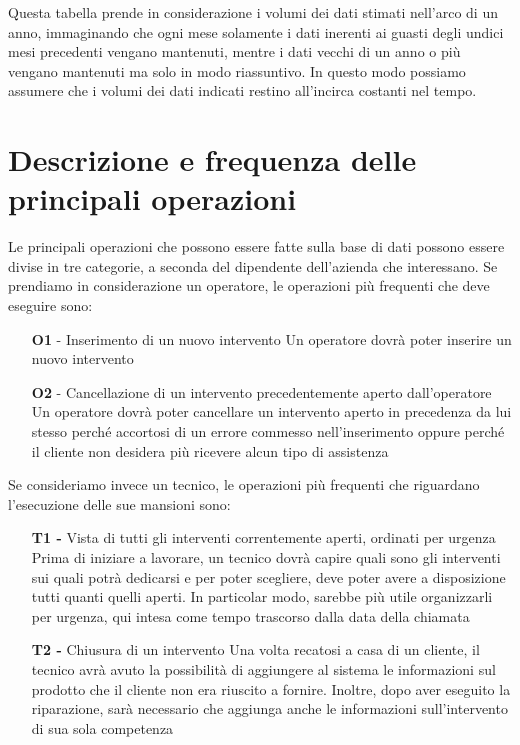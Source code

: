 \documentclass[a4paper, 12pt]{report}
\begin{document}
Questa tabella prende in considerazione i volumi dei dati stimati nell'arco di un anno, immaginando che ogni mese solamente i dati inerenti ai guasti
degli undici mesi precedenti vengano mantenuti, mentre i dati vecchi di un anno o più vengano mantenuti ma solo in modo riassuntivo. In questo modo
possiamo assumere che i volumi dei dati indicati restino all'incirca costanti nel tempo.

\section{Descrizione e frequenza delle principali operazioni}

Le principali operazioni che possono essere fatte sulla base di dati possono essere divise in tre categorie, a seconda del dipendente
dell'azienda che interessano. Se prendiamo in considerazione un operatore, le operazioni più frequenti che deve eseguire sono:

\begin{itemize}
	\item[\textbf{O1} -] Inserimento di un nuovo intervento
		\subitem Un operatore dovrà poter inserire un nuovo intervento 
	\item[\textbf{O2} -] Cancellazione di un intervento precedentemente aperto dall'operatore
		\subitem Un operatore dovrà poter cancellare un intervento aperto in precedenza da lui stesso perché accortosi di un errore commesso nell'inserimento
		oppure perché il cliente non desidera più ricevere alcun tipo di assistenza
\end{itemize}

Se consideriamo invece un tecnico, le operazioni più frequenti che riguardano l'esecuzione delle sue mansioni sono:

\begin{itemize}
	\item[\textbf{T1 -}] Vista di tutti gli interventi correntemente aperti, ordinati per urgenza
		\subitem Prima di iniziare a lavorare, un tecnico dovrà capire quali sono gli interventi sui quali potrà dedicarsi e per poter scegliere, deve poter avere a
		disposizione tutti quanti quelli aperti. In particolar modo, sarebbe più utile organizzarli per urgenza, qui intesa come tempo trascorso dalla data della chiamata
	\item[\textbf{T2 -}] Chiusura di un intervento
		\subitem Una volta recatosi a casa di un cliente, il tecnico avrà avuto la possibilità di aggiungere al sistema le informazioni sul prodotto che il cliente
		non era riuscito a fornire. Inoltre, dopo aver eseguito la riparazione, sarà necessario che aggiunga anche le informazioni sull'intervento di sua sola competenza
\end{itemize}
\end{document}
